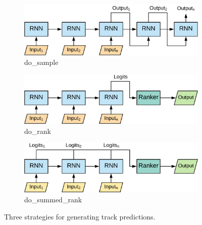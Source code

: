 \begin{figure}
	\centering
	\begin{subfigure}{0.4\textwidth}
		\includegraphics[width=\textwidth]{figures/sample.pdf}
		\caption{do\_sample}
	\end{subfigure}
	\begin{subfigure}{0.4\textwidth}
		\includegraphics[width=\textwidth]{figures/rank.pdf}
		\caption{do\_rank}
	\end{subfigure}
	\begin{subfigure}{0.4\textwidth}
		\includegraphics[width=\textwidth]{figures/summed.pdf}
		\caption{do\_summed\_rank}
	\end{subfigure}
	\caption{Three strategies for generating track predictions.}
	\label{fig:predictions}
\end{figure}
